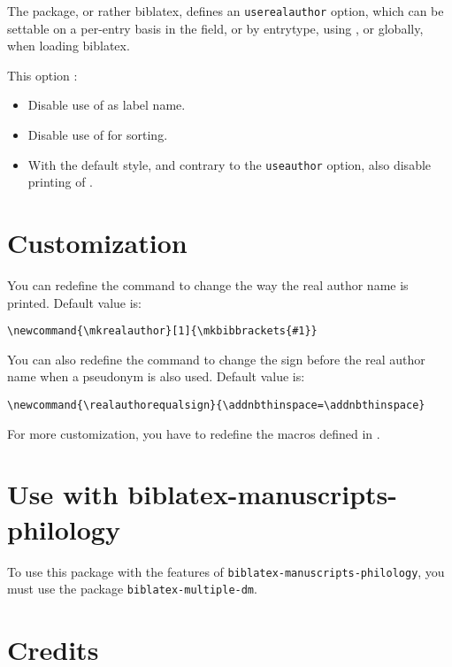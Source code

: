 \documentclass{ltxdockit}[2011/03/25]
\newcommand{\biblatex}{biblatex\xspace}
\begin{document}
The package, or rather \biblatex, defines an \verb+userealauthor+ option, which can be settable on a per-entry basis in the  field, or by entrytype, using , or globally, when loading \biblatex. 

This option :
\begin{itemize}
	\item Disable use of  as label name.
	\item Disable use of  for sorting.
	\item With the default style, and contrary to the \verb+useauthor+ option, also disable printing of .
\end{itemize}


\section{Customization}

You can redefine the  command to change the way the real author name is printed. Default value is:

\begin{verbatim}
\newcommand{\mkrealauthor}[1]{\mkbibbrackets{#1}}
\end{verbatim}

You can also redefine the  command to change the sign before the real author name when a pseudonym is also used. Default value is:

\begin{verbatim}
\newcommand{\realauthorequalsign}{\addnbthinspace=\addnbthinspace}
\end{verbatim}

For more customization, you have to redefine the macros defined in .




\section{Use with biblatex-manuscripts-philology}

To use this package with the features of \verb+biblatex-manuscripts-philology+, you must use the package \verb+biblatex-multiple-dm+.

\section{Credits}
\end{document}
